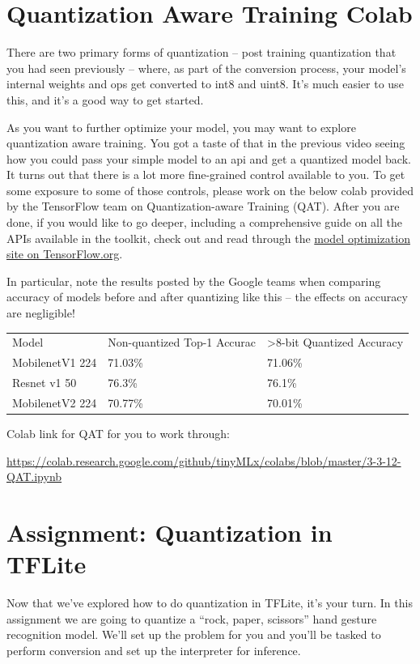 \section{Quantization Aware Training Colab}

There are two primary forms of quantization -- post training quantization that you had seen previously -- where, as part of the conversion process, your model’s internal weights and ops get converted to int8 and uint8. It’s much easier to use this, and it’s a good way to get started.

As you want to further optimize your model, you may want to explore quantization aware training. You got a taste of that in the previous video seeing how you could pass your simple model to an api and get a quantized model back. It turns out that there is a lot more fine-grained control available to you. To get some exposure to some of those controls, please work on the below colab provided by the TensorFlow team on Quantization-aware Training (QAT). After you are done, if you would like to go deeper, including a comprehensive guide on all the APIs available in the toolkit, check out and read through the \href{https://www.tensorflow.org/model_optimization/guide/quantization/training}{model optimization site on TensorFlow.org}.

In particular, note the results posted by the Google teams when comparing accuracy of models before and after quantizing like this -- the effects on accuracy are negligible!

\begin{tabular}{lll}
Model & Non-quantized Top-1 Accurac &>8-bit Quantized Accuracy\\
MobilenetV1 224 & 71.03\% & 71.06\% \\
Resnet v1 50  & 76.3\% & 76.1\% \\
MobilenetV2 224 & 70.77\% & 70.01\% \\
\end{tabular}

Colab link for QAT for you to work through:

\url{https://colab.research.google.com/github/tinyMLx/colabs/blob/master/3-3-12-QAT.ipynb}

\section{Assignment: Quantization in TFLite}

Now that we've explored how to do quantization in TFLite, it's your turn. In this assignment we are going to quantize a ``rock, paper, scissors'' hand gesture recognition model. We'll set up the problem for you and you’ll be tasked to perform conversion and set up the interpreter for inference.

